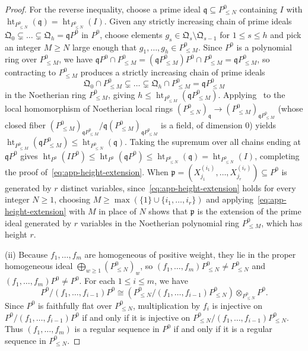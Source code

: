 \documentclass[a4paper, 12pt, reqno]{amsart}
\theoremstyle{remark}
\begin{document}
\begin{proof}
  For the reverse inequality,
  choose a prime ideal $\mathfrak{q} \subseteq P^0_{\le N}$ containing $I$ with $\operatorname{ht}_{P^0_{\le N}}(\mathfrak{q}) = \operatorname{ht}_{P^0_{\le N}}(I)$.
  Given any strictly increasing chain of prime ideals $\mathfrak{Q}_0 \subsetneq \dots \subsetneq \mathfrak{Q}_h = \mathfrak{q} P^0$ in $P^0$,
  choose elements $g_s \in \mathfrak{Q}_s \setminus \mathfrak{Q}_{s - 1}$ for $1 \le s \le h$ and pick an integer $M \ge N$ large enough that $g_1, \dots, g_h \in P^0_{\le M}$.
  Since $P^0$ is a polynomial ring over $P^0_{\le M}$,
  we have $\mathfrak{q} P^0 \cap P^0_{\le M} = (\mathfrak{q} P^0_{\le M}) P^0 \cap P^0_{\le M} = \mathfrak{q} P^0_{\le M}$,
  so contracting to $P^0_{\le M}$ produces a strictly increasing chain of prime ideals
  \begin{equation*}
    \mathfrak{Q}_0 \cap P^0_{\le M} \subsetneq \dots \subsetneq \mathfrak{Q}_h \cap P^0_{\le M} = \mathfrak{q} P^0_{\le M}
  \end{equation*}
  in the Noetherian ring $P^0_{\le M}$,
  giving $h \le \operatorname{ht}_{P^0_{\le M}}(\mathfrak{q} P^0_{\le M})$.
  Applying~\cite[Theorem~10.10]{eisenbud_commalg_1995} to the local homomorphism of Noetherian local rings $(P^0_{\le N})_{\mathfrak{q}} \to (P^0_{\le M})_{\mathfrak{q} P^0_{\le M}}$
  (whose closed fiber $(P^0_{\le M})_{\mathfrak{q} P^0_{\le M}} / \mathfrak{q}(P^0_{\le M})_{\mathfrak{q} P^0_{\le M}}$ is a field, of dimension $0$)
  yields $\operatorname{ht}_{P^0_{\le M}}(\mathfrak{q} P^0_{\le M}) \le \operatorname{ht}_{P^0_{\le N}}(\mathfrak{q})$.
  Taking the supremum over all chains ending at $\mathfrak{q} P^0$ gives $\operatorname{ht}_{P^0}(I P^0) \le \operatorname{ht}_{P^0}(\mathfrak{q} P^0) \le \operatorname{ht}_{P^0_{\le N}}(\mathfrak{q}) = \operatorname{ht}_{P^0_{\le N}}(I)$,
  completing the proof of~\eqref{eq:app-height-extension}.
  When $\mathfrak{p} = (X_{j_1}^{(i_1)}, \dots, X_{j_r}^{(i_r)}) \subseteq P^0$ is generated by $r$ distinct variables,
  since~\eqref{eq:app-height-extension} holds for every integer $N \ge 1$,
  choosing $M \ge \max(\{1\} \cup \{i_1, \dots, i_r\})$ and applying~\eqref{eq:app-height-extension} with $M$ in place of $N$ shows that $\mathfrak{p}$ is the extension of the prime ideal generated by $r$ variables in the Noetherian polynomial ring $P^0_{\le M}$,
  which has height $r$.

  (ii) Because $f_1, \dots, f_m$ are homogeneous of positive weight,
  they lie in the proper homogeneous ideal $\bigoplus_{w \ge 1} (P^0_{\le N})_w$,
  so $(f_1, \dots, f_m)P^0_{\le N} \ne P^0_{\le N}$ and $(f_1, \dots, f_m)P^0 \ne P^0$.
  For each $1 \le i \le m$,
  we have
  \begin{equation*}
    P^0 / (f_1, \dots, f_{i - 1})P^0 \cong \left(P^0_{\le N} / (f_1, \dots, f_{i - 1})P^0_{\le N}\right) \otimes_{P^0_{\le N}} P^0.
  \end{equation*}
  Since $P^0$ is faithfully flat over $P^0_{\le N}$,
  multiplication by $f_i$ is injective on $P^0 / (f_1, \dots, f_{i - 1})P^0$ if and only if it is injective on $P^0_{\le N} / (f_1, \dots, f_{i - 1})P^0_{\le N}$.
  Thus $(f_1, \dots, f_m)$ is a regular sequence in $P^0$ if and only if it is a regular sequence in $P^0_{\le N}$.


\end{proof}
\end{document}
